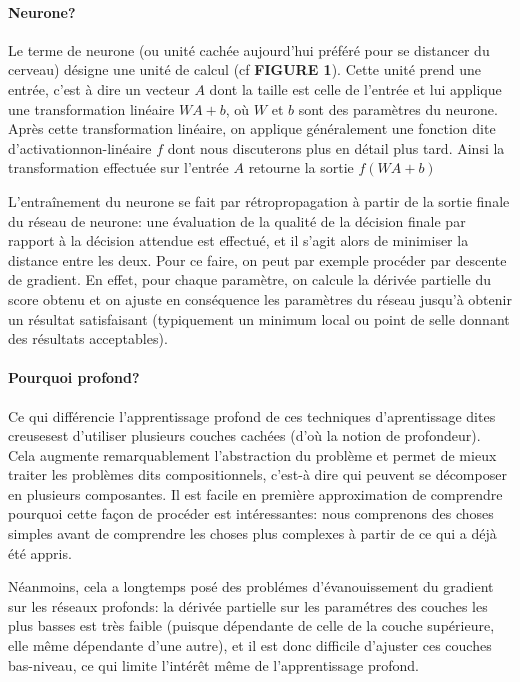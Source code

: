 \documentclass[a4paper, 11pt, onecolumn]{article}
\begin{document}
\paragraph{Neurone?}

Le terme de neurone (ou unité cachée aujourd'hui préféré pour se distancer du
cerveau) désigne une unité de calcul (cf \textbf{FIGURE 1}). Cette unité prend
une entrée, c'est à dire un vecteur $A$ dont la taille est celle de l'entrée et lui
applique une transformation linéaire $WA + b$, où $W$ et $b$ sont des paramètres
du neurone. Après cette transformation linéaire, on applique généralement une
fonction dite \og d'activation\fg non-linéaire $f$ dont nous discuterons plus en
détail plus tard. Ainsi la transformation effectuée sur l'entrée $A$ retourne la
sortie $f(WA + b)$

L'entraînement du neurone se fait par rétropropagation à partir de la sortie
finale du réseau de neurone: une évaluation de la qualité de la décision finale
par rapport à la décision attendue est effectué, et il
s'agit alors de minimiser la distance entre les deux. Pour ce
faire, on peut par exemple procéder par descente de gradient. En effet, pour
chaque paramètre, on calcule la dérivée partielle du score obtenu et on ajuste en
conséquence les paramètres du réseau jusqu'à obtenir un résultat satisfaisant
(typiquement un minimum local ou point de selle donnant des résultats acceptables).

\paragraph{Pourquoi profond?}

Ce qui différencie l'apprentissage profond de ces techniques d'aprentissage dites \og
creuses\fg est d'utiliser plusieurs couches cachées (d'où la notion de
profondeur). Cela augmente remarquablement l'abstraction du problème et permet
de mieux traiter les problèmes dits compositionnels, c'est-à dire qui peuvent se
décomposer en plusieurs composantes. Il est facile en première approximation de
comprendre pourquoi cette façon de procéder est intéressantes: nous comprenons
des choses simples avant de comprendre les choses plus complexes à partir de ce
qui a déjà été appris.

Néanmoins, cela a longtemps posé des problémes d'évanouissement du gradient sur les
réseaux profonds: la dérivée partielle sur les paramétres des couches les plus
basses est très faible (puisque dépendante de celle de la couche
supérieure, elle même dépendante d'une autre), et il est donc difficile d'ajuster ces couches
bas-niveau, ce qui limite l'intérêt même de l'apprentissage profond.
\end{document}
